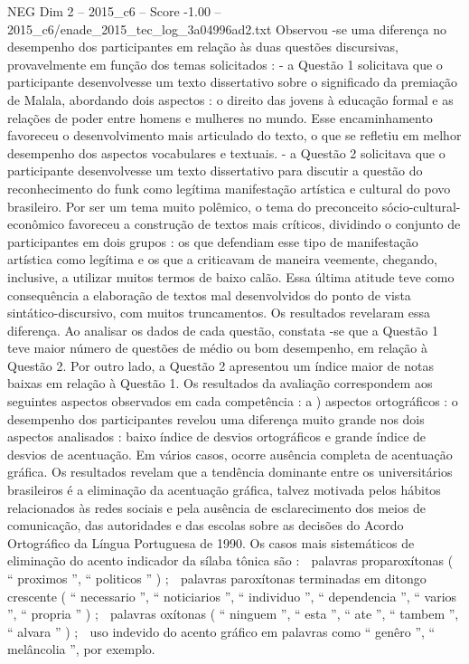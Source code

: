 \begin{textsample}{NEG Dim 2 – 2015\_c6 – Score -1.00 – 2015\_c6/enade\_2015\_tec\_log\_3a04996ad2.txt}
Observou -se uma diferença no desempenho dos participantes em relação às duas questões discursivas, provavelmente em função dos temas solicitados : - a Questão 1 solicitava que o participante desenvolvesse um texto dissertativo sobre o significado da premiação de Malala, abordando dois aspectos : o direito das jovens à educação formal e as relações de poder entre homens e mulheres no mundo.
Esse encaminhamento favoreceu o desenvolvimento mais articulado do texto, o que se refletiu em melhor desempenho dos aspectos vocabulares e textuais. - a Questão 2 solicitava que o participante desenvolvesse um texto dissertativo para discutir a questão do reconhecimento do funk como legítima manifestação artística e cultural do povo brasileiro.
Por ser um tema muito polêmico, o tema do preconceito sócio-cultural-econômico favoreceu a construção de textos mais críticos, dividindo o conjunto de participantes em dois grupos : os que defendiam esse tipo de manifestação artística como legítima e os que a criticavam de maneira veemente, chegando, inclusive, a utilizar muitos termos de baixo calão.
Essa última atitude teve como consequência a elaboração de textos mal desenvolvidos do ponto de vista sintático-discursivo, com muitos truncamentos.
Os resultados revelaram essa diferença.
Ao analisar os dados de cada questão, constata -se que a Questão 1 teve maior número de questões de médio ou bom desempenho, em relação à Questão 2.
Por outro lado, a Questão 2 apresentou um índice maior de notas baixas em relação à Questão 1.
Os resultados da avaliação correspondem aos seguintes aspectos observados em cada competência : a ) aspectos ortográficos : o desempenho dos participantes revelou uma diferença muito grande nos dois aspectos analisados : baixo índice de desvios ortográficos e grande índice de desvios de acentuação.
Em vários casos, ocorre ausência completa de acentuação gráfica.
Os resultados revelam que a tendência dominante entre os universitários brasileiros é a eliminação da acentuação gráfica, talvez motivada pelos hábitos relacionados às redes sociais e pela ausência de esclarecimento dos meios de comunicação, das autoridades e das escolas sobre as decisões do Acordo Ortográfico da Língua Portuguesa de 1990.
Os casos mais sistemáticos de eliminação do acento indicador da sílaba tônica são :  palavras proparoxítonas ( “ proximos ”, “ politicos ” ) ;  palavras paroxítonas terminadas em ditongo crescente ( “ necessario ”, “ noticiarios ”, “ individuo ”, “ dependencia ”, “ varios ”, “ propria ” ) ;  palavras oxítonas ( “ ninguem ”, “ esta ”, “ ate ”, “ tambem ”, “ alvara ” ) ;  uso indevido do acento gráfico em palavras como “ genêro ”, “ melâncolia ”, por exemplo.

\end{textsample}
